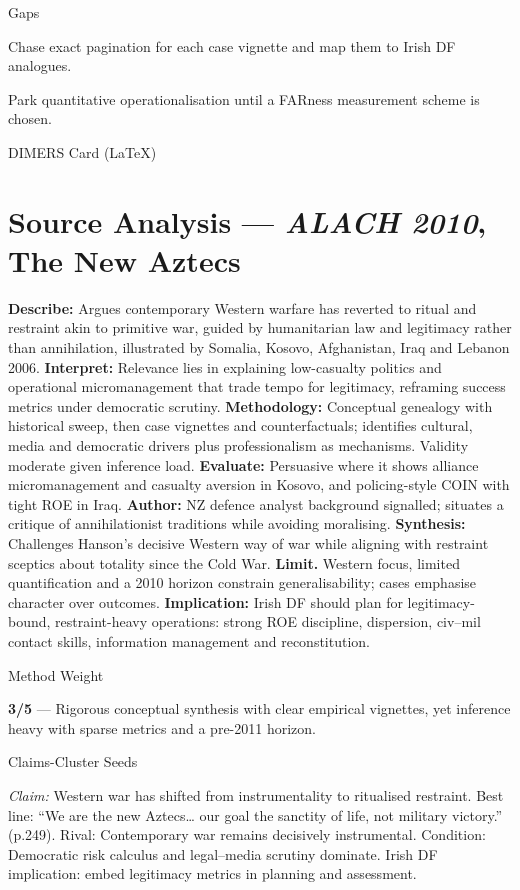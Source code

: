 Gaps

Chase exact pagination for each case vignette and map them to Irish DF analogues.

Park quantitative operationalisation until a FARness measurement scheme is chosen.

\parencite{ALACH_2010}
DIMERS Card (LaTeX)

\section*{Source Analysis — \textit{ALACH 2010}, The New Aztecs}
\textbf{Describe:} Argues contemporary Western warfare has reverted to ritual and restraint akin to primitive war, guided by humanitarian law and legitimacy rather than annihilation, illustrated by Somalia, Kosovo, Afghanistan, Iraq and Lebanon 2006.
\textbf{Interpret:} Relevance lies in explaining low-casualty politics and operational micromanagement that trade tempo for legitimacy, reframing success metrics under democratic scrutiny.
\textbf{Methodology:} Conceptual genealogy with historical sweep, then case vignettes and counterfactuals; identifies cultural, media and democratic drivers plus professionalism as mechanisms. Validity moderate given inference load.
\textbf{Evaluate:} Persuasive where it shows alliance micromanagement and casualty aversion in Kosovo, and policing-style COIN with tight ROE in Iraq.
\textbf{Author:} NZ defence analyst background signalled; situates a critique of annihilationist traditions while avoiding moralising.
\textbf{Synthesis:} Challenges Hanson’s decisive Western way of war while aligning with restraint sceptics about totality since the Cold War.
\textbf{Limit.} Western focus, limited quantification and a 2010 horizon constrain generalisability; cases emphasise character over outcomes.
\textbf{Implication:} Irish DF should plan for legitimacy-bound, restraint-heavy operations: strong ROE discipline, dispersion, civ–mil contact skills, information management and reconstitution.

Method Weight

\textbf{3/5} — Rigorous conceptual synthesis with clear empirical vignettes, yet inference heavy with sparse metrics and a pre-2011 horizon.

Claims-Cluster Seeds

\textit{Claim:} Western war has shifted from instrumentality to ritualised restraint. Best line: “We are the new Aztecs… our goal the sanctity of life, not military victory.” (p.249). Rival: Contemporary war remains decisively instrumental. Condition: Democratic risk calculus and legal–media scrutiny dominate. Irish DF implication: embed legitimacy metrics in planning and assessment.

